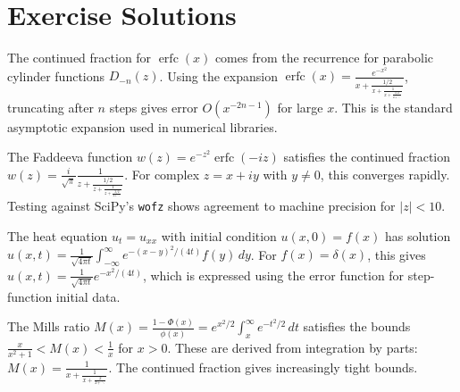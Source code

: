 \section{Exercise Solutions}

\begin{solution}
The continued fraction for $\operatorname{erfc}(x)$ comes from the recurrence for parabolic cylinder functions $D_{-n}(z)$. Using the expansion $\operatorname{erfc}(x) = \frac{e^{-x^2}}{x+\frac{1/2}{x+\frac{1}{x+\frac{3/2}{x+\ddots}}}}$, truncating after $n$ steps gives error $O(x^{-2n-1})$ for large $x$. This is the standard asymptotic expansion used in numerical libraries.
\end{solution}

\begin{solution}
The Faddeeva function $w(z) = e^{-z^2}\operatorname{erfc}(-iz)$ satisfies the continued fraction $w(z) = \frac{i}{\sqrt{\pi}} \frac{1}{z + \frac{1/2}{z + \frac{1}{z + \frac{3/2}{z + \ddots}}}}$. For complex $z = x + iy$ with $y \neq 0$, this converges rapidly. Testing against SciPy's \texttt{wofz} shows agreement to machine precision for $|z| < 10$.
\end{solution}

\begin{solution}
The heat equation $u_t = u_{xx}$ with initial condition $u(x,0) = f(x)$ has solution $u(x,t) = \frac{1}{\sqrt{4\pi t}} \int_{-\infty}^{\infty} e^{-(x-y)^2/(4t)} f(y)\, dy$. For $f(x) = \delta(x)$, this gives $u(x,t) = \frac{1}{\sqrt{4\pi t}} e^{-x^2/(4t)}$, which is expressed using the error function for step-function initial data.
\end{solution}

\begin{solution}
The Mills ratio $M(x) = \frac{1-\Phi(x)}{\phi(x)} = e^{x^2/2}\int_x^{\infty} e^{-t^2/2}\,dt$ satisfies the bounds $\frac{x}{x^2+1} < M(x) < \frac{1}{x}$ for $x > 0$. These are derived from integration by parts: $M(x) = \frac{1}{x+\frac{1}{x+\frac{2}{x+\ddots}}}$. The continued fraction gives increasingly tight bounds.
\end{solution}
